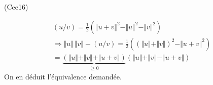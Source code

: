 \begin{tiny}(Cee16)\end{tiny}
\begin{multline*}
 (u/v)=\frac{1}{2}\left(\Vert u+v \Vert^2 -\Vert u \Vert^2 -\Vert v \Vert^2  \right) \\
\Rightarrow
\Vert u \Vert\, \Vert v \Vert -(u/v) 
=\frac{1}{2}\left( (\Vert u \Vert + \Vert v \Vert)^2-\Vert u + v \Vert^2\right)\\
=\underset{\geq 0}{\underbrace{\left(\Vert u \Vert + \Vert v \Vert +\Vert u + v \Vert \right)}}
\left(\Vert u \Vert + \Vert v \Vert -\Vert u + v \Vert \right)
\end{multline*}
On en déduit l'équivalence demandée.